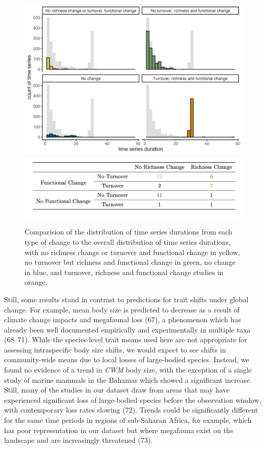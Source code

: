 \documentclass{article}
\begin{document}
\begin{figure}
\includegraphics[width=\textwidth]{../../figures/duration_hist} \includegraphics[width=\textwidth]{../../figures/functional_change_table} \caption{Comparision of the distribution of time series durations from each type of change to the overall distribution of time series durations, with no richness change or turnover and functional change in yellow, no turnover but richness and functional change in green, no change in blue, and turnover, richness and functional change studies in orange.}\label{fig:changeScenarios}
\end{figure}

Still, some results stand in contrast to predictions for trait shifts
under global change. For example, mean body size is predicted to
decrease as a result of climate change impacts and megafaunal loss (67),
a phenomenon which has already been well documented empirically and
experimentally in multiple taxa (68--71). While the species-level trait
means used here are not appropriate for assessing intraspecific body
size shifts, we would expect to see shifts in community-wide means due
to local losses of large-bodied species. Instead, we found no evidence
of a trend in \emph{CWM} body size, with the exception of a single study
of marine mammals in the Bahamas which showed a significant increase.
Still, many of the studies in our dataset draw from areas that may have
experienced significant loss of large-bodied species before the
observation window, with contemporary loss rates slowing (72). Trends
could be significantly different for the same time periods in regions of
sub-Saharan Africa, for example, which has poor representation in our
dataset but where megafauna exist on the landscape and are increasingly
threatened (73).
\end{document}
